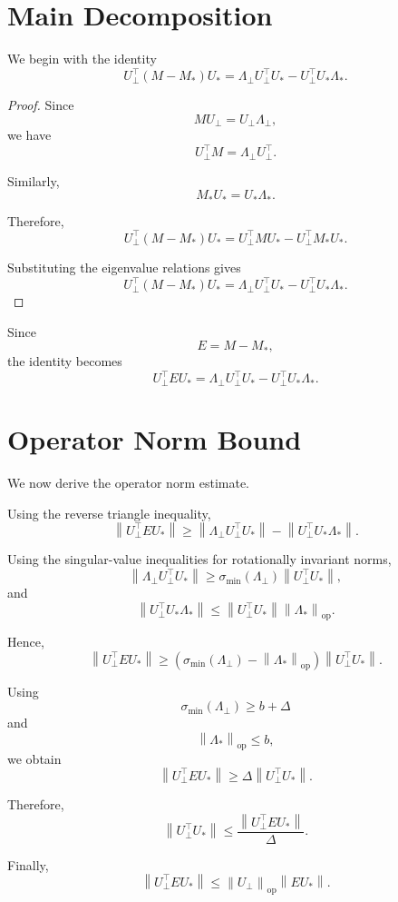 \documentclass[12pt,oneside]{book}
\numberwithin{equation}{section}
\theoremstyle{definition}
\theoremstyle{plain}
\theoremstyle{remark}
\newcommand{\norm}[1]{\left\lVert #1 \right\rVert}
\begin{document}
\section{Main Decomposition}

We begin with the identity
\[
U_\perp^\top(M-M_*)U_*
=
\Lambda_\perp U_\perp^\top U_*
-
U_\perp^\top U_*\Lambda_*.
\]

\begin{proof}
Since
\[
MU_\perp
=
U_\perp\Lambda_\perp,
\]
we have
\[
U_\perp^\top M
=
\Lambda_\perp U_\perp^\top.
\]

Similarly,
\[
M_*U_*
=
U_*\Lambda_*.
\]

Therefore,
\[
U_\perp^\top(M-M_*)U_*
=
U_\perp^\top MU_*
-
U_\perp^\top M_*U_*.
\]

Substituting the eigenvalue relations gives
\[
U_\perp^\top(M-M_*)U_*
=
\Lambda_\perp U_\perp^\top U_*
-
U_\perp^\top U_*\Lambda_*.
\]
\end{proof}

Since
\[
E=M-M_*,
\]
the identity becomes
\[
U_\perp^\top E U_*
=
\Lambda_\perp U_\perp^\top U_*
-
U_\perp^\top U_*\Lambda_*.
\]

\section{Operator Norm Bound}

We now derive the operator norm estimate.

Using the reverse triangle inequality,
\[
\norm{U_\perp^\top E U_*}
\geq
\norm{\Lambda_\perp U_\perp^\top U_*}
-
\norm{U_\perp^\top U_*\Lambda_*}.
\]

Using the singular-value inequalities for rotationally invariant norms,
\[
\norm{\Lambda_\perp U_\perp^\top U_*}
\geq
\sigma_{\min}(\Lambda_\perp)
\norm{U_\perp^\top U_*},
\]
and
\[
\norm{U_\perp^\top U_*\Lambda_*}
\leq
\norm{U_\perp^\top U_*}
\norm{\Lambda_*}_{\mathrm{op}}.
\]

Hence,
\[
\norm{U_\perp^\top E U_*}
\geq
\left(
\sigma_{\min}(\Lambda_\perp)
-
\norm{\Lambda_*}_{\mathrm{op}}
\right)
\norm{U_\perp^\top U_*}.
\]

Using
\[
\sigma_{\min}(\Lambda_\perp)\geq b+\Delta
\]
and
\[
\norm{\Lambda_*}_{\mathrm{op}}\leq b,
\]
we obtain
\[
\norm{U_\perp^\top E U_*}
\geq
\Delta
\norm{U_\perp^\top U_*}.
\]

Therefore,
\[
\norm{U_\perp^\top U_*}
\leq
\frac{
\norm{U_\perp^\top E U_*}
}{\Delta}.
\]

Finally,
\[
\norm{U_\perp^\top E U_*}
\leq
\norm{U_\perp}_{\mathrm{op}}
\norm{E U_*}.
\]
\end{document}
